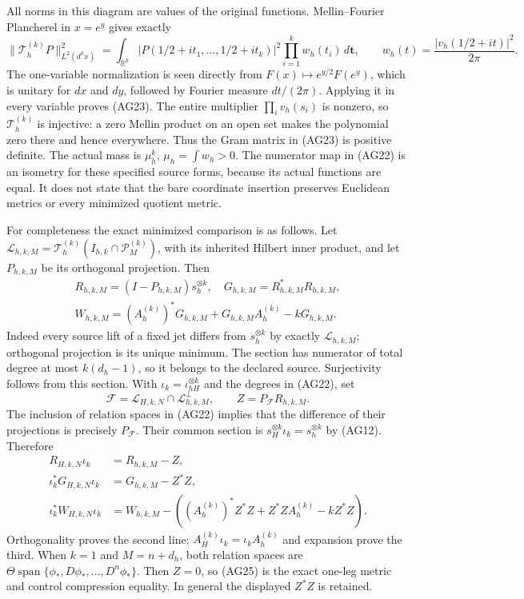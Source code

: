 All norms in this diagram are values of the original functions.
Mellin--Fourier Plancherel in $x=e^y$ gives exactly
\[
 \|\mathcal T_h^{(k)}P\|_{L^2(d^kx)}^2
 =\int_{\mathbb R^k}|P(1/2+it_1,\ldots,1/2+it_k)|^2
                \prod_{i=1}^k w_h(t_i)\,d\mathbf t,
 \qquad w_h(t)=\frac{|v_h(1/2+it)|^2}{2\pi}.
 \tag{AG23}
\]
The one-variable normalization is seen directly from
$F(x)\mapsto e^{y/2}F(e^y)$, which is unitary for $dx$ and $dy$,
followed by Fourier measure $dt/(2\pi)$.  Applying it in every
variable proves (AG23).  The entire multiplier $\prod_i v_h(s_i)$
is nonzero, so $\mathcal T_h^{(k)}$ is injective: a zero Mellin
product on an open set makes the polynomial zero there and hence
everywhere.  Thus the Gram matrix in (AG23) is positive definite.
The actual mass is $\mu_h^k$, $\mu_h=\int w_h>0$.
The numerator map in (AG22) is an isometry for these specified
source forms, because its actual functions are equal.  It does
not state that the bare coordinate insertion preserves Euclidean
metrics or every minimized quotient metric.

For completeness the exact minimized comparison is as follows.
Let $\mathcal L_{h,k,M}=\mathcal T_h^{(k)}
(I_{h,k}\cap\mathcal P_M^{(k)})$, with its inherited Hilbert
inner product, and let $P_{h,k,M}$ be its orthogonal projection.
Then
\[
 \begin{gathered}
 R_{h,k,M}=(I-P_{h,k,M})s_h^{\otimes k},\quad
 G_{h,k,M}=R_{h,k,M}^*R_{h,k,M},\\
 W_{h,k,M}=(A_h^{(k)})^*G_{h,k,M}
             +G_{h,k,M}A_h^{(k)}-kG_{h,k,M}.
 \end{gathered}
 \tag{AG24}
\]
Indeed every source lift of a fixed jet differs from
$s_h^{\otimes k}$ by exactly $\mathcal L_{h,k,M}$;
orthogonal projection is its unique minimum.  The section has
numerator of total degree at most $k(d_h-1)$, so it belongs to
the declared source.  Surjectivity follows from this section.
With $\iota_k=\iota_{hH}^{\otimes k}$ and the degrees in (AG22),
set
\[
 \mathcal F=\mathcal L_{H,k,N}\cap\mathcal L_{h,k,M}^{\perp},
 \qquad Z=P_{\mathcal F}R_{h,k,M}.
\]
The inclusion of relation spaces in (AG22) implies that the difference
of their projections is precisely $P_{\mathcal F}$.  Their common
section is $s_H^{\otimes k}\iota_k=s_h^{\otimes k}$ by (AG12).
Therefore
\[
 \begin{split}
 R_{H,k,N}\iota_k&=R_{h,k,M}-Z,\\
 \iota_k^*G_{H,k,N}\iota_k&=G_{h,k,M}-Z^*Z,\\
 \iota_k^*W_{H,k,N}\iota_k&=W_{h,k,M}
 -( (A_h^{(k)})^*Z^*Z+Z^*ZA_h^{(k)}-kZ^*Z).
 \end{split}\tag{AG25}
\]
Orthogonality proves the second line; $A_H^{(k)}\iota_k=
\iota_kA_h^{(k)}$ and expansion prove the third.  When $k=1$
and $M=n+d_h$, both relation spaces are
$\Theta\operatorname{span}\{\phi_*,D\phi_*,\ldots,D^n\phi_*\}$.
Then $Z=0$, so (AG25) is the exact one-leg metric and control
compression equality.  In general the displayed $Z^*Z$ is retained.

